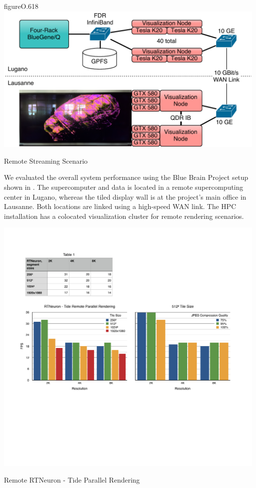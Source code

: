 \begin{wrapfloat}{figure}{O}{.618\textwidth}
  \includegraphics[width=.618\textwidth]{images/tideSetup}
  {\caption{\label{fTideSetup}Remote Streaming Scenario}}
\end{wrapfloat}

We evaluated the overall system performance using the Blue Brain Project setup
shown in . The supercomputer and data is located in a remote
supercomputing center in Lugano, whereas the tiled display wall is at the
project's main office in Lausanne. Both locations are linked using a high-speed
WAN link. The HPC installation has a colocated visualization cluster for remote
rendering scenarios.

\begin{benchmark}[h!t]\center
  \includegraphics[width=\columnwidth]{results/tide}
  \caption{\label{rTide}Remote RTNeuron - Tide Parallel Rendering}
\end{benchmark}

